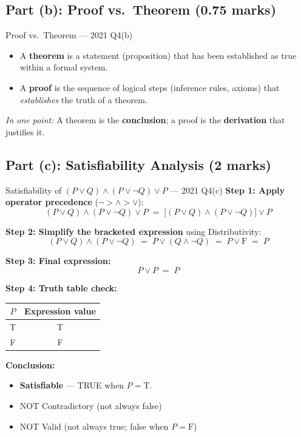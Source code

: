 \documentclass[12pt,a4paper]{article}
\begin{document}
\subsection{Part (b): Proof vs.\ Theorem (0.75 marks)}

\begin{solbox}{Proof vs.\ Theorem --- 2021 Q4(b)}
\begin{itemize}[noitemsep]
  \item A \textbf{theorem} is a statement (proposition) that has been established as true within a formal system.
  \item A \textbf{proof} is the sequence of logical steps (inference rules, axioms) that \textit{establishes} the truth of a theorem.
\end{itemize}
\textit{In one point:} A theorem is the \textbf{conclusion}; a proof is the \textbf{derivation} that justifies it.
\end{solbox}

\subsection{Part (c): Satisfiability Analysis (2 marks)}

\begin{solbox}{Satisfiability of $(P \lor Q)\land(P \lor \neg Q)\lor P$ --- 2021 Q4(c)}
\textbf{Step 1: Apply operator precedence} ($\neg > \land > \lor$):
\[(P \lor Q)\land(P \lor \neg Q)\lor P \;=\; \bigl[(P \lor Q)\land(P \lor \neg Q)\bigr] \lor P\]

\textbf{Step 2: Simplify the bracketed expression} using Distributivity:
\[(P \lor Q)\land(P \lor \neg Q) \;=\; P \lor (Q \land \neg Q) \;=\; P \lor \mathrm{F} \;=\; P\]

\textbf{Step 3: Final expression:}
\[P \lor P \;=\; P\]

\textbf{Step 4: Truth table check:}
\begin{center}
\begin{tabular}{c|c}
  \toprule
  $P$ & Expression value\\
  \midrule
  T & T \\
  F & F \\
  \bottomrule
\end{tabular}
\end{center}

\textbf{Conclusion:}
\begin{itemize}[noitemsep]
  \item \textbf{Satisfiable} --- TRUE when $P = \mathrm{T}$. \checkmark
  \item NOT Contradictory (not always false)
  \item NOT Valid (not always true; false when $P = \mathrm{F}$)
\end{itemize}
\end{solbox}
\end{document}
